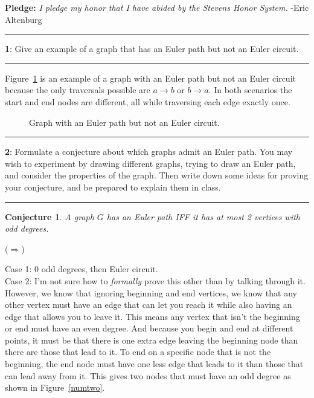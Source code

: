 \documentclass[11pt]{article}
\newtheorem{conjecture}{Conjecture}
\newcommand\question[2]{\vspace{.25in}\hrule\textbf{#1}: #2\vspace{.5em}\hrule\vspace{.10in}}
\begin{document}
\raggedright
\newcommand\NAME{Eric Altenburg}  %
\newcommand\COURSE{MA-240}
\newcommand\HWNUM{15}              %


\textbf{Pledge:} \textit{I pledge my honor that I have abided by the Stevens Honor System.} -Eric Altenburg

\question{1}{Give an example of a graph that has an Euler path but not an Euler circuit.}
Figure~\ref{ep_nec} is an example of a graph with an Euler path but not an Euler circuit because the only traversals possible are $a \rightarrow b$ or $b \rightarrow a$. In both scenarios the start and end nodes are different, all while traversing each edge exactly once.
\begin{figure}[ht]
	\centering
	\caption{Graph with an Euler path but not an Euler circuit.}
	\label{ep_nec}
\end{figure}

\question{2}{Formulate a conjecture about which graphs admit an Euler path. You may wish to experiment by drawing different graphs, trying to draw an Euler path, and consider the properties of the graph. Then write down some ideas for proving your conjecture, and be prepared to explain them in class.}

\begin{conjecture}
	A graph $G$ has an Euler path IFF it has at most 2 vertices with odd degrees.
\end{conjecture}

($\Longrightarrow$)

Case 1: 0 odd degrees, then Euler circuit.\\
Case 2: I'm not sure how to \textit{formally} prove this other than by talking through it. However, we know that ignoring beginning and end vertices, we know that any other vertex must have an edge that can let you reach it while also having an edge that allows you to leave it. This means any vertex that isn't the beginning or end must have an even degree. And because you begin and end at different points, it must be that there is one extra edge leaving the beginning node than there are those that lead to it. To end on a specific node that is not the beginning, the end node must have one less edge that leads to it than those that can lead away from it. This gives two nodes that must have an odd degree as shown in Figure~\ref{numtwo}.
\end{document}
